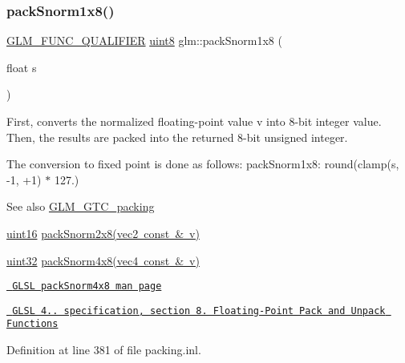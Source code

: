 \mbox{\label{group__gtc__packing_ga26b6cd7a35c46c4b6a342f3b97b47423}} 
\subsubsection{\texorpdfstring{packSnorm1x8()}{packSnorm1x8()}}
{\footnotesize\ttfamily \mbox{\hyperlink{setup_8hpp_a33fdea6f91c5f834105f7415e2a64407}{G\+L\+M\+\_\+\+F\+U\+N\+C\+\_\+\+Q\+U\+A\+L\+I\+F\+I\+ER}} \mbox{\hyperlink{group__gtc__type__precision_ga1a7dcd8aac97cc8020817c94049deff2}{uint8}} glm\+::pack\+Snorm1x8 (\begin{DoxyParamCaption}\item[{float}]{s }\end{DoxyParamCaption})}

First, converts the normalized floating-\/point value v into 8-\/bit integer value. Then, the results are packed into the returned 8-\/bit unsigned integer.

The conversion to fixed point is done as follows\+: pack\+Snorm1x8\+: round(clamp(s, -\/1, +1) $\ast$ 127.)

\begin{DoxySeeAlso}{See also}
\mbox{\hyperlink{group__gtc__packing}{G\+L\+M\+\_\+\+G\+T\+C\+\_\+packing}} 

\mbox{\hyperlink{group__gtc__type__precision_gad8c2939e1fdd8e5828b31d95c52255d5}{uint16}} \mbox{\hyperlink{group__gtc__packing_ga05d08a82923166ec7cd5d0e6154c9953}{pack\+Snorm2x8(vec2 const \& v)}} 

\mbox{\hyperlink{group__gtc__type__precision_ga202b6a53c105fcb7e531f9b443518451}{uint32}} \mbox{\hyperlink{group__core__func__packing_gafcf25acc0d361c6c696a433aa5dfd16b}{pack\+Snorm4x8(vec4 const \& v)}} 

\href{http://www.opengl.org/sdk/docs/manglsl/xhtml/packSnorm4x8.xml}{\texttt{ G\+L\+SL pack\+Snorm4x8 man page}} 

\href{http://www.opengl.org/registry/doc/GLSLangSpec.4.20.8.pdf}{\texttt{ G\+L\+SL 4.. specification, section 8. Floating-\/\+Point Pack and Unpack Functions}} 
\end{DoxySeeAlso}


Definition at line 381 of file packing.\+inl.

\mbox{\label{group__gtc__packing_ga05d08a82923166ec7cd5d0e6154c9953}} 
